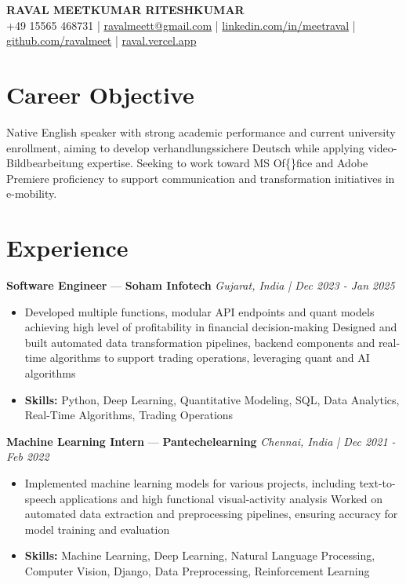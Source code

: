 \documentclass[a4paper,10pt]{article}
\begin{document}
\begin{center}
  {\Large\bfseries RAVAL MEETKUMAR RITESHKUMAR}\\[2pt]
  {\small +49 15565 468731 \;|\; \href{mailto:ravalmeett@gmail.com}{ravalmeett@gmail.com} \;|\; \href{https://www.linkedin.com/in/meetraval/}{linkedin.com/in/meetraval} \;|\; \href{https://github.com/ravalmeet}{github.com/ravalmeet} \;|\; \href{https://raval.vercel.app/}{raval.vercel.app}}
\end{center}
\vspace{-3pt}

\section*{Career Objective}
Native English speaker with strong academic performance and current university enrollment, aiming to develop verhandlungssichere Deutsch while applying video-Bildbearbeitung expertise. Seeking to work toward MS Of\{\}fice and Adobe Premiere proficiency to support communication and transformation initiatives in e-mobility.\par

\section*{Experience}
\textbf{Software Engineer} — \textbf{Soham Infotech} \hfill \textit{Gujarat, India \;|\; Dec 2023 - Jan 2025}\par
\vspace{1pt}
\begin{itemize}
  \item Developed multiple functions, modular API endpoints and quant models achieving high level of profitability in financial decision-making Designed and built automated data transformation pipelines, backend components and real-time algorithms to support trading operations, leveraging quant and AI algorithms
  \item \textbf{Skills:} Python, Deep Learning, Quantitative Modeling, SQL, Data Analytics, Real-Time Algorithms, Trading Operations
\end{itemize}
\vspace{3pt}
\textbf{Machine Learning Intern} — \textbf{Pantechelearning} \hfill \textit{Chennai, India \;|\; Dec 2021 - Feb 2022}\par
\vspace{1pt}
\begin{itemize}
  \item Implemented machine learning models for various projects, including text-to-speech applications and high functional visual-activity analysis Worked on automated data extraction and preprocessing pipelines, ensuring accuracy for model training and evaluation
  \item \textbf{Skills:} Machine Learning, Deep Learning, Natural Language Processing, Computer Vision, Django, Data Preprocessing, Reinforcement Learning
\end{itemize}
\end{document}
